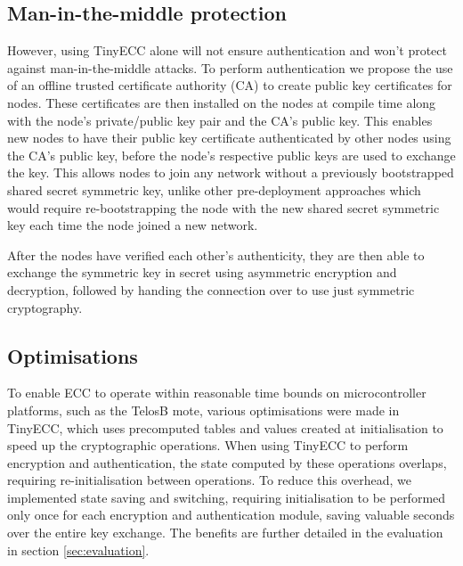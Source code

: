 \documentclass{mpaper}
\begin{document}
\subsection{Man-in-the-middle protection} %
\label{sub:man_in_the_middle_protection}
However, using TinyECC alone will not ensure authentication and won't protect against man-in-the-middle attacks. To perform authentication we propose the use of an offline trusted certificate authority (CA) to create public key certificates for nodes. These certificates are then installed on the nodes at compile time along with the node's private/public key pair and the CA's public key. This enables new nodes to have their public key certificate authenticated by other nodes using the CA's public key, before the node's respective public keys are used to exchange the key. This allows nodes to join any network without a previously bootstrapped shared secret symmetric key, unlike other pre-deployment approaches which would require re-bootstrapping the node with the new shared secret symmetric key each time the node joined a new network.

After the nodes have verified each other's authenticity, they are then able to exchange the symmetric key in secret using asymmetric encryption and decryption, followed by handing the connection over to use just symmetric cryptography. 

\subsection{Optimisations} %
\label{sub:optimisations}
To enable ECC to operate within reasonable time bounds on microcontroller platforms, such as the TelosB mote, various optimisations were made in TinyECC, which uses precomputed tables and values created at initialisation to speed up the cryptographic operations. When using TinyECC to perform encryption and authentication, the state computed by these operations overlaps, requiring re-initialisation between operations. To reduce this overhead, we implemented state saving and switching, requiring initialisation to be performed only once for each encryption and authentication module, saving valuable seconds over the entire key exchange. The benefits are further detailed in the evaluation in section \ref{sec:evaluation}.
\end{document}
